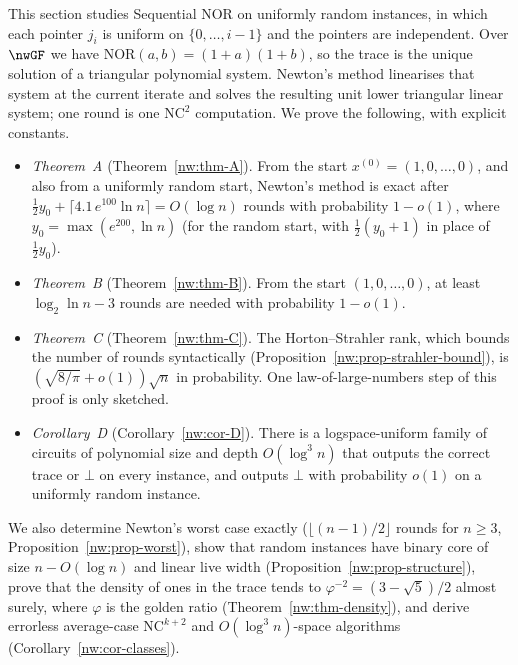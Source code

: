 \documentclass[11pt]{amsart}
\theoremstyle{definition}
\theoremstyle{remark}
\newcommand{\NOR}{\mathrm{NOR}}
\begin{document}
This section studies Sequential NOR on uniformly random instances, in which
each pointer $j_i$ is uniform on $\{0,\dots,i-1\}$ and the pointers are
independent. Over $\nwGF$ we have $\NOR(a,b)=(1+a)(1+b)$, so the trace is the
unique solution of a triangular polynomial system. Newton's method linearises
that system at the current iterate and solves the resulting unit lower
triangular linear system; one round is one $\mathrm{NC}^2$ computation. We
prove the following, with explicit constants.
\begin{itemize}[leftmargin=*]
\item \emph{Theorem~A} (Theorem~\ref{nw:thm-A}). From the start
  $x^{(0)}=(1,0,\dots,0)$, and also from a uniformly random start, Newton's
  method is exact after $\tfrac12 y_0+\lceil 4.1\,e^{100}\ln n\rceil=O(\log n)$
  rounds with probability $1-o(1)$, where $y_0=\max(e^{200},\ln n)$ (for the
  random start, with $\frac12(y_0+1)$ in place of $\frac12y_0$).
\item \emph{Theorem~B} (Theorem~\ref{nw:thm-B}). From the start
  $(1,0,\dots,0)$, at least $\log_2\ln n-3$ rounds are needed with
  probability $1-o(1)$.
\item \emph{Theorem~C} (Theorem~\ref{nw:thm-C}). The Horton--Strahler rank,
  which bounds the number of rounds syntactically
  (Proposition~\ref{nw:prop-strahler-bound}), is $(\sqrt{8/\pi}+o(1))\sqrt n$
  in probability. One law-of-large-numbers step of this proof is only
  sketched.
\item \emph{Corollary~D} (Corollary~\ref{nw:cor-D}). There is a
  logspace-uniform family of circuits of polynomial size and depth
  $O(\log^3 n)$ that outputs the correct trace or $\bot$ on every instance,
  and outputs $\bot$ with probability $o(1)$ on a uniformly random instance.
\end{itemize}
We also determine Newton's worst case exactly ($\lfloor (n-1)/2\rfloor$ rounds
for $n\ge 3$, Proposition~\ref{nw:prop-worst}), show that random instances have
binary core of size $n-O(\log n)$ and linear live width
(Proposition~\ref{nw:prop-structure}), prove that the density of ones in the
trace tends to $\varphi^{-2}=(3-\sqrt5)/2$ almost surely, where $\varphi$ is
the golden ratio (Theorem~\ref{nw:thm-density}), and derive errorless
average-case $\mathrm{NC}^{k+2}$ and $O(\log^3 n)$-space algorithms
(Corollary~\ref{nw:cor-classes}).
\end{document}

